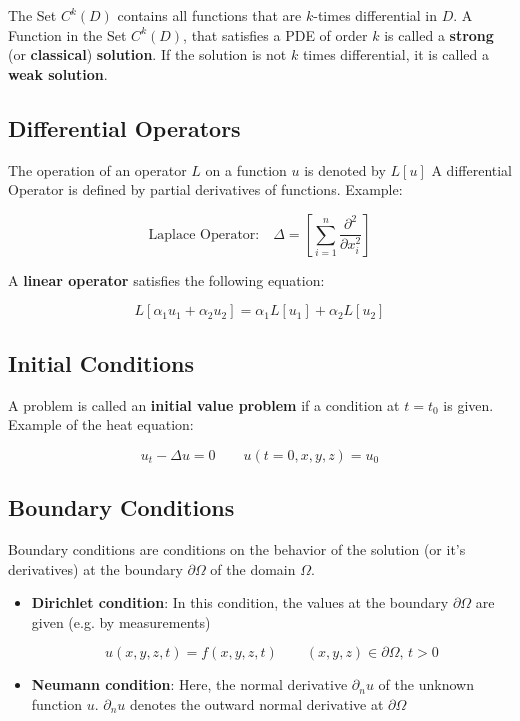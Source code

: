 \documentclass{article}
\begin{document}
\begin{twocolumn}
The Set $C^k(D)$ contains all functions that are $k$-times differential in $D$. 
A Function in the Set $C^k(D)$, that satisfies a PDE of order $k$ is called a \textbf{strong} (or \textbf{classical}) \textbf{solution}. 
If the solution is not $k$ times differential, it is called a \textbf{weak solution}.

\subsection{Differential Operators}

The operation of an operator $L$ on a function $u$ is denoted by $L[u]$
A differential Operator is defined by partial derivatives of functions. 
Example:

$$\text{Laplace Operator:} \quad \Delta = \left[\sum_{i=1}^{n} \frac{\partial^2}{\partial x_i^2}\right]$$

A \textbf{linear operator} satisfies the following equation:

$$L[\alpha_1 u_1 + \alpha_2 u_2] = \alpha_1 L[u_1] + \alpha_2 L[u_2]$$

\subsection{Initial Conditions}

A problem is called an \textbf{initial value problem} if a condition at $t = t_0$ is given. Example of the heat equation:

$$u_t - \Delta u = 0 \qquad u(t=0, x, y, z) = u_0$$

\subsection{Boundary Conditions}

Boundary conditions are conditions on the behavior of the solution (or it's derivatives) at the boundary $\partial \Omega$ of the domain $\Omega$. 

\begin{itemize}
	\item \textbf{Dirichlet condition}: In this condition, the values at the boundary $\partial \Omega$ are given (e.g. by measurements)
	
	$$u(x,y,z,t) = f(x,y,z,t) \qquad (x,y,z) \in \partial \Omega, \, t > 0$$
	
	\item \textbf{Neumann condition}: Here, the normal derivative $\partial_n u$ of the unknown function $u$. $\partial_n u$ denotes the outward normal derivative at $\partial \Omega$
	

\end{itemize}
\end{twocolumn}
\end{document}
